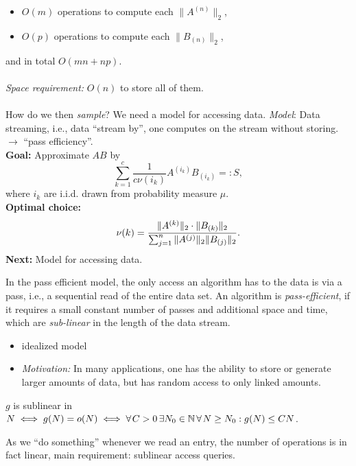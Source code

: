\begin{itemize}
	\item $O(m)$ operations to compute each $\|A^{(n)}\|_2$,
	\item $O(p)$ operations to compute each $\|B_{(n)}\|_2$,
\end{itemize}
and in total $O(mn+np)$. \\\\
\emph{Space requirement:} $O(n)$ to store all of them.\\\\
How do we then \emph{sample}? We need a model for accessing data. \emph{Model}: Data streaming, i.e., data ``stream by'', one computes on the stream without storing. $\to$ ``pass efficiency''.\\\drawaline
{}
\textbf{Goal:} Approximate $AB$ by
\begin{equation*}
\sum_{k=1}^c \frac{1}{c\nu(i_k)} A^{(i_k)} B_{(i_k)} =: S,
\end{equation*}
where $i_k$ are i.i.d. drawn from probability measure $\mu$.\vspace{0.5pc} \\
\textbf{Optimal choice:}
\begin{equation*}
\nu(k) = \frac{\| A^{(k)}\|_2 \cdot \|B_{(k)}\|_2}{\sum_{j=1}^n \|A^{(j)}\|_2 \|B_{(j)}\|_2}.\vspace{0.5pc}
\end{equation*}
\textbf{Next:} Model for accessing data.
\begin{definition} In the pass efficient model, the only access an algorithm has to the data is via a pass, i.e., a sequential read of the entire data set. An algorithm is \emph{pass-efficient}, if it requires a small constant number of passes and additional space and time, which are \emph{sub-linear} in the length of the data stream. \vspace{-0.5pc}
\begin{itemize}[-,itemsep=0pt]
\item idealized model
\item \emph{Motivation:} In many applications, one has the ability to store or generate larger amounts of data, but has random access to only linked amounts. 
\end{itemize}
$g$ is sublinear in $N \iff g(N) = o(N) \iff \forall C >0 \, \exists N_0 \in \N \, \forall N \geq N_0: g(N) \leq CN$. 
\end{definition}
\begin{remark*}
As we ``do something'' whenever we read an entry, the number of operations is in fact linear, main requirement: sublinear access queries.
\end{remark*}
